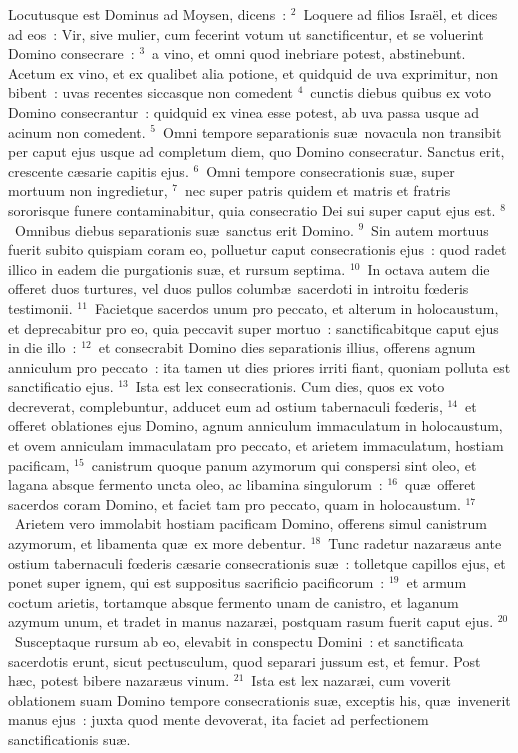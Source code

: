 \lettrine[lines=3,image=true,loversize=0.05,lraise=-0.03]{L}{}ocutusque est Dominus ad Moysen, dicens~:
${}^{2}$~Loquere ad filios Isra\"el, et dices ad eos~: Vir, sive mulier, cum fecerint votum ut sanctificentur, et se voluerint Domino consecrare~:
${}^{3}$~a vino, et omni quod inebriare potest, abstinebunt. Acetum ex vino, et ex qualibet alia potione, et quidquid de uva exprimitur, non bibent~: uvas recentes siccasque non comedent
${}^{4}$~cunctis diebus quibus ex voto Domino consecrantur~: quidquid ex vinea esse potest, ab uva passa usque ad acinum non comedent.
${}^{5}$~Omni tempore separationis su\ae\ novacula non transibit per caput ejus usque ad completum diem, quo Domino consecratur. Sanctus erit, crescente c\ae sarie capitis ejus.
${}^{6}$~Omni tempore consecrationis su\ae , super mortuum non ingredietur,
${}^{7}$~nec super patris quidem et matris et fratris sororisque funere contaminabitur, quia consecratio Dei sui super caput ejus est.
${}^{8}$~Omnibus diebus separationis su\ae\ sanctus erit Domino.
${}^{9}$~Sin autem mortuus fuerit subito quispiam coram eo, polluetur caput consecrationis ejus~: quod radet illico in eadem die purgationis su\ae , et rursum septima.
${}^{10}$~In octava autem die offeret duos turtures, vel duos pullos columb\ae\ sacerdoti in introitu fœderis testimonii.
${}^{11}$~Facietque sacerdos unum pro peccato, et alterum in holocaustum, et deprecabitur pro eo, quia peccavit super mortuo~: sanctificabitque caput ejus in die illo~:
${}^{12}$~et consecrabit Domino dies separationis illius, offerens agnum anniculum pro peccato~: ita tamen ut dies priores irriti fiant, quoniam polluta est sanctificatio ejus.
${}^{13}$~Ista est lex consecrationis. Cum dies, quos ex voto decreverat, complebuntur, adducet eum ad ostium tabernaculi fœderis,
${}^{14}$~et offeret oblationes ejus Domino, agnum anniculum immaculatum in holocaustum, et ovem anniculam immaculatam pro peccato, et arietem immaculatum, hostiam pacificam,
${}^{15}$~canistrum quoque panum azymorum qui conspersi sint oleo, et lagana absque fermento uncta oleo, ac libamina singulorum~:
${}^{16}$~qu\ae\ offeret sacerdos coram Domino, et faciet tam pro peccato, quam in holocaustum.
${}^{17}$~Arietem vero immolabit hostiam pacificam Domino, offerens simul canistrum azymorum, et libamenta qu\ae\ ex more debentur.
${}^{18}$~Tunc radetur nazar\ae us ante ostium tabernaculi fœderis c\ae sarie consecrationis su\ae~: tolletque capillos ejus, et ponet super ignem, qui est suppositus sacrificio pacificorum~:
${}^{19}$~et armum coctum arietis, tortamque absque fermento unam de canistro, et laganum azymum unum, et tradet in manus nazar\ae i, postquam rasum fuerit caput ejus.
${}^{20}$~Susceptaque rursum ab eo, elevabit in conspectu Domini~: et sanctificata sacerdotis erunt, sicut pectusculum, quod separari jussum est, et femur. Post h\ae c, potest bibere nazar\ae us vinum.
${}^{21}$~Ista est lex nazar\ae i, cum voverit oblationem suam Domino tempore consecrationis su\ae , exceptis his, qu\ae\ invenerit manus ejus~: juxta quod mente devoverat, ita faciet ad perfectionem sanctificationis su\ae .



